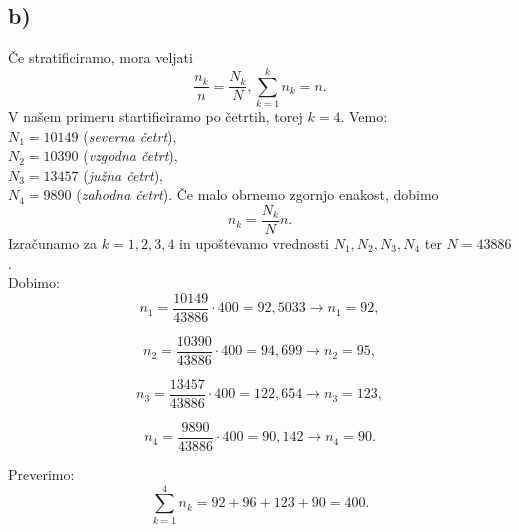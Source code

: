 \documentclass{article}
\begin{document}
\subsection*{b)}

Če stratificiramo, mora veljati 
\begin{equation}
\frac{n_k}{n} = \frac{N_k}{N},   \sum_{k=1}^k n_k = n .
\end{equation}
V našem primeru startificiramo po četrtih, torej $k=4$.
Vemo:\\
$N_1 = 10 149$ (\textit{severna četrt}),\\
$N_2 = 10 390$ (\textit{vzgodna četrt}),\\
$N_3 = 13 457$ (\textit{južna četrt}),\\
$N_4 = 9 890$ (\textit{zahodna četrt}).
Če malo obrnemo zgornjo enakost, dobimo
\begin{equation}
n_k = \frac{N_k}{N} n.
\end{equation}
Izračunamo za $k = 1,2,3,4$ in upoštevamo vrednosti $N_1,N_2,N_3,N_4$ ter $N = 43886$.\\
Dobimo:
\begin{equation}
n_1 = \frac{10149}{43886} \cdot 400 = 92,5033 \rightarrow n_1 = 92,
\end{equation}

\begin{equation}
n_2 = \frac{10390}{43886} \cdot 400 = 94, 699 \rightarrow n_2 = 95,
\end{equation}

\begin{equation}
n_3 = \frac{13457}{43886} \cdot 400 = 122,654 \rightarrow n_3 = 123,
\end{equation}

\begin{equation}
n_4 = \frac{9890}{43886} \cdot 400 = 90,142 \rightarrow n_4 = 90.
\end{equation}

Preverimo:
\begin{equation}
\sum_{k=1}^{4}n_k = 92+96+123+90 = 400.
\end{equation}
\end{document}
